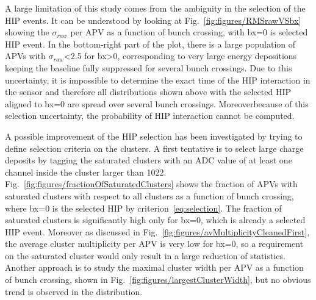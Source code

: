 
A large limitation of this study comes from the ambiguity in the selection of the HIP events. It can be understood by looking at Fig.~\ref{fig:figures/RMSrawVSbx} showing the $\sigma_{raw}$ per APV as a function of bunch crossing, with bx=0 is selected HIP event. In the bottom-right part of the plot, there is a large population of APVs with $\sigma_{raw}$<2.5 for bx>0, corresponding to very large energy depositions keeping the baseline fully suppressed for several bunch crossings. Due to this uncertainty, it is impossible to determine the exact time of the HIP interaction in the sensor and therefore all distributions shown above with the selected HIP aligned to bx=0 are spread over several bunch crossings. Moreoverbecause of this selection uncertainty, the probability of HIP interaction cannot be computed. 


A possible improvement of the HIP selection has been investigated by trying to define selection criteria on the clusters. A first tentative is to select large charge deposits by tagging the saturated clusters with an ADC value of at least one channel inside the cluster larger than 1022. Fig.~\ref{fig:figures/fractionOfSaturatedClusters} shows the fraction of APVs with saturated clusters with respect to all clusters as a function of bunch crossing, where bx=0 is the selected HIP by criterion~\ref{eq:selection}. The fraction of saturated clusters is significantly high only for bx=0, which is already a selected HIP event. Moreover as discussed in Fig.~\ref{fig:figures/avMultiplicityCleanedFirst}, the average cluster multiplicity per APV is very low for bx=0, so a requirement on the saturated cluster would only result in a large reduction of statistics. Another approach is to study the maximal cluster width per APV as a function of bunch crossing, shown in Fig.~\ref{fig:figures/largestClusterWidth}, but no obvious trend is observed in the distribution. 

